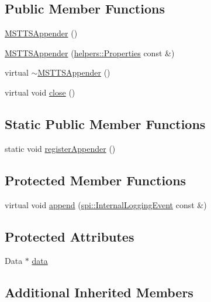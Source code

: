 \subsection*{Public Member Functions}
\begin{DoxyCompactItemize}
\item 
\hyperlink{classlog4cplus_1_1MSTTSAppender_a1b2ec74fed5774f3a2360148678ad8b1}{M\-S\-T\-T\-S\-Appender} ()
\item 
\hyperlink{classlog4cplus_1_1MSTTSAppender_aa41d80084d9a503137c29053f7ce83c8}{M\-S\-T\-T\-S\-Appender} (\hyperlink{classlog4cplus_1_1helpers_1_1Properties}{helpers\-::\-Properties} const \&)
\item 
virtual \hyperlink{classlog4cplus_1_1MSTTSAppender_ac4239429949148bcf457803ed8d3bef2}{$\sim$\-M\-S\-T\-T\-S\-Appender} ()
\item 
virtual void \hyperlink{classlog4cplus_1_1MSTTSAppender_a3aaaac500f577c4f2b9f10e8b85f7d7a}{close} ()
\end{DoxyCompactItemize}
\subsection*{Static Public Member Functions}
\begin{DoxyCompactItemize}
\item 
static void \hyperlink{classlog4cplus_1_1MSTTSAppender_acef185d8d595f83348a10c1f6caaff91}{register\-Appender} ()
\end{DoxyCompactItemize}
\subsection*{Protected Member Functions}
\begin{DoxyCompactItemize}
\item 
virtual void \hyperlink{classlog4cplus_1_1MSTTSAppender_ababac94cc8d966a8c004becec9f3e6ad}{append} (\hyperlink{classlog4cplus_1_1spi_1_1InternalLoggingEvent}{spi\-::\-Internal\-Logging\-Event} const \&)
\end{DoxyCompactItemize}
\subsection*{Protected Attributes}
\begin{DoxyCompactItemize}
\item 
Data $\ast$ \hyperlink{classlog4cplus_1_1MSTTSAppender_ae1f38e7eb5c51d12340aa525d1e4c2b8}{data}
\end{DoxyCompactItemize}
\subsection*{Additional Inherited Members}


